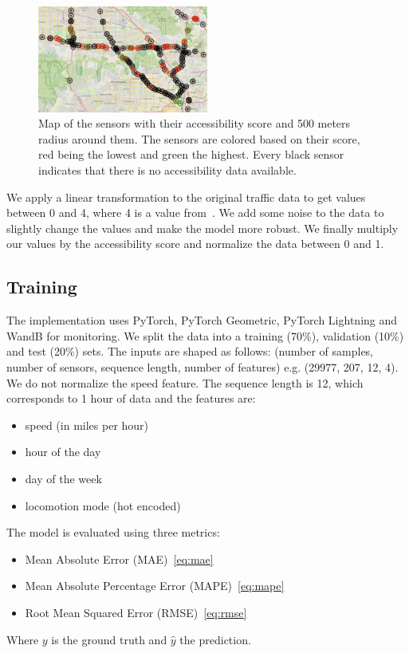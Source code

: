 \begin{figure}[htbp]
    \centering
    \includegraphics[width=0.5\textwidth]{resources/map}
    \caption{
        Map of the sensors with their accessibility score and 500 meters radius around them.
        The sensors are colored based on their score, red being the lowest and green the highest.
        Every black sensor indicates that there is no accessibility data available.
    }
    \label{fig:map}
\end{figure}

We apply a linear transformation to the original traffic data to get values between 0 and 4, where 4 is a value from~\cite{FreedomMobility}.
We add some noise to the data to slightly change the values and make the model more robust.
We finally multiply our values by the accessibility score and normalize the data between 0 and 1.

\subsection{Training}\label{subsec:training}
The implementation uses PyTorch, PyTorch Geometric, PyTorch Lightning and WandB for monitoring.
We split the data into a training (70\%), validation (10\%) and test (20\%) sets.
The inputs are shaped as follows: (number of samples, number of sensors, sequence length, number of features) e.g. (29977, 207, 12, 4).
We do not normalize the speed feature.
The sequence length is 12, which corresponds to 1 hour of data and the features are:

\begin{itemize}
    \item speed (in miles per hour)
    \item hour of the day
    \item day of the week
    \item locomotion mode (hot encoded)
\end{itemize}
\vspace{1em}

The model is evaluated using three metrics:
\begin{itemize}
    \item Mean Absolute Error (MAE)~\eqref{eq:mae}
    \item Mean Absolute Percentage Error (MAPE)~\eqref{eq:mape}
    \item Root Mean Squared Error (RMSE)~\eqref{eq:rmse}
\end{itemize}
Where $y$ is the ground truth and $\hat{y}$ the prediction.

